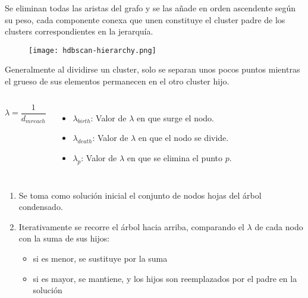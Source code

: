 \begin{frame}

    Se eliminan todas las aristas del grafo y se las añade en orden ascendente según su peso, cada componente conexa que unen constituye el cluster padre de los clusters correspondientes en la jerarquía.

    \begin{figure}[!h]
        \centering
        \texttt{[image: hdbscan-hierarchy.png]}
    \end{figure}

\end{frame}

\begin{frame}

    Generalmente al dividirse un cluster, solo se separan unos pocos puntos mientras el grueso de sus elementos permanecen en el otro cluster hijo.

    \pause
    {\footnotesize
    \begin{columns}

        \begin{equation*}
            \lambda = \frac{1}{d_{mreach}}
        \end{equation*}


        \begin{itemize}
            \item $\lambda_{birth}$: Valor de $\lambda$ en que surge el nodo.
            \item $\lambda_{death}$: Valor de $\lambda$ en que el nodo se divide.
            \item $\lambda_p$: Valor de $\lambda$ en que se elimina el punto $p$.
        \end{itemize}

    \end{columns}
    }

    \begin{enumerate}
        \item<3-> Se toma como solución inicial el conjunto de nodos hojas del árbol condensado.
        \item<4-> Iterativamente se recorre el árbol hacia arriba, comparando el $\lambda$ de cada nodo con la suma de sus hijos:
        \begin{itemize}
            \item<5-> si es menor, se sustituye por la suma
            \item<5-> si es mayor, se mantiene, y los hijos son reemplazados por el padre en la solución
        \end{itemize}
    \end{enumerate}

\end{frame}

